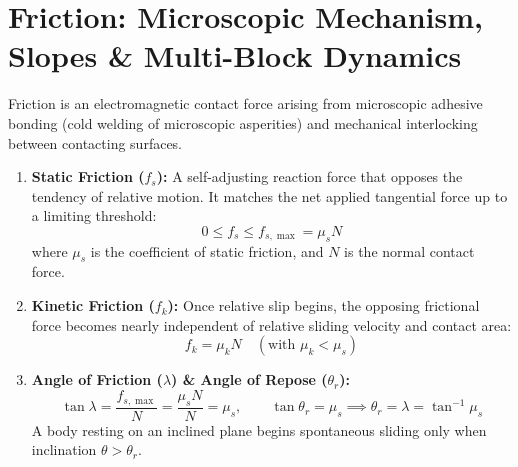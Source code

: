 \documentclass[10pt,a4paper]{article}
\begin{document}
\section{Friction: Microscopic Mechanism, Slopes \& Multi-Block Dynamics}

\begin{conceptbox}
Friction is an electromagnetic contact force arising from microscopic adhesive bonding (cold welding of microscopic asperities) and mechanical interlocking between contacting surfaces.
\begin{enumerate}[leftmargin=*]
  \item \textbf{Static Friction ($f_s$):} A self-adjusting reaction force that opposes the tendency of relative motion. It matches the net applied tangential force up to a limiting threshold:
  \begin{equation}
    0 \le f_s \le f_{s,\max} = \mu_s N
  \end{equation}
  where $\mu_s$ is the coefficient of static friction, and $N$ is the normal contact force.
  \item \textbf{Kinetic Friction ($f_k$):} Once relative slip begins, the opposing frictional force becomes nearly independent of relative sliding velocity and contact area:
  \begin{equation}
    f_k = \mu_k N \quad (\text{with } \mu_k < \mu_s)
  \end{equation}
  \item \textbf{Angle of Friction ($\lambda$) \& Angle of Repose ($\theta_r$):}
  \begin{equation}
    \tan\lambda = \frac{f_{s,\max}}{N} = \frac{\mu_s N}{N} = \mu_s, \qquad \tan\theta_r = \mu_s \implies \theta_r = \lambda = \tan^{-1}\mu_s
  \end{equation}
  A body resting on an inclined plane begins spontaneous sliding only when inclination $\theta > \theta_r$.
\end{enumerate}
\end{conceptbox}
\end{document}
